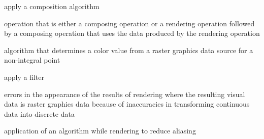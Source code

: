 %
apply a composition algorithm
%

%
operation that is either a composing operation or a rendering operation followed by a composing operation that uses the data produced by the rendering operation

%
algorithm that determines a color value from a raster graphics data source for a non-integral point

%
apply a filter

%
errors in the appearance of the results of rendering where the resulting visual data is raster graphics data because of inaccuracies in transforming continuous data into discrete data

%
application of an algorithm while rendering to reduce aliasing

%

%
%

